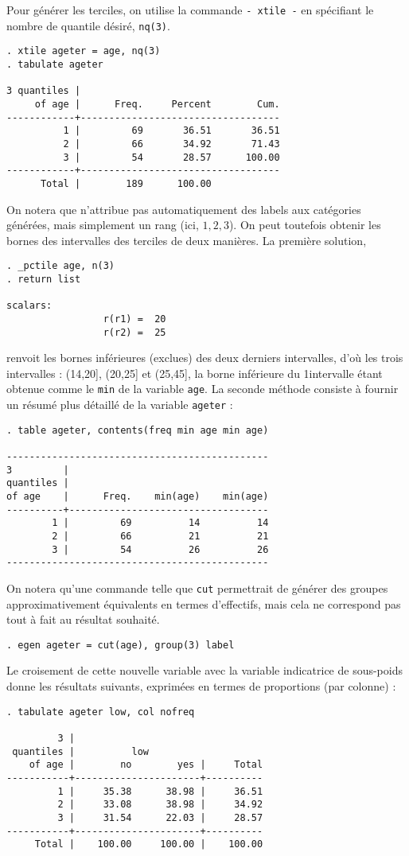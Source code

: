 Pour générer les terciles, on utilise la commande \verb|- xtile -| en
spécifiant le nombre de quantile désiré, \texttt{nq(3)}. 
\begin{verbatim}
. xtile ageter = age, nq(3)
. tabulate ageter

3 quantiles |
     of age |      Freq.     Percent        Cum.
------------+-----------------------------------
          1 |         69       36.51       36.51
          2 |         66       34.92       71.43
          3 |         54       28.57      100.00
------------+-----------------------------------
      Total |        189      100.00
\end{verbatim}
On notera que \Stata n'attribue pas automatiquement des labels aux catégories
générées, mais simplement un rang (ici, ${1,2,3}$). On peut toutefois
obtenir les bornes des intervalles des terciles de deux manières. La
première solution, 
\begin{verbatim}
. _pctile age, n(3)
. return list

scalars:
                 r(r1) =  20
                 r(r2) =  25
\end{verbatim}
renvoit les bornes inférieures (exclues) des deux derniers intervalles, d'où
les trois intervalles : (14,20], (20,25] et (25,45], la borne inférieure du
1\ier intervalle étant obtenue comme le \texttt{min} de la variable
\texttt{age}. La seconde méthode consiste à fournir un résumé plus détaillé
de la variable \texttt{ageter} :
\begin{verbatim}
. table ageter, contents(freq min age min age)

----------------------------------------------
3         |
quantiles |
of age    |      Freq.    min(age)    min(age)
----------+-----------------------------------
        1 |         69          14          14
        2 |         66          21          21
        3 |         54          26          26
----------------------------------------------
\end{verbatim}

On notera qu'une commande telle que \texttt{cut} permettrait de générer des
groupes approximativement équivalents en termes d'effectifs, mais cela ne
correspond pas tout à fait au résultat souhaité.
\begin{verbatim}
. egen ageter = cut(age), group(3) label
\end{verbatim}

Le croisement de cette nouvelle variable avec la variable indicatrice de
sous-poids donne les résultats suivants, exprimées en termes de proportions
(par colonne) :
\begin{verbatim}
. tabulate ageter low, col nofreq

         3 |
 quantiles |          low
    of age |        no        yes |     Total
-----------+----------------------+----------
         1 |     35.38      38.98 |     36.51 
         2 |     33.08      38.98 |     34.92 
         3 |     31.54      22.03 |     28.57 
-----------+----------------------+----------
     Total |    100.00     100.00 |    100.00
\end{verbatim}

